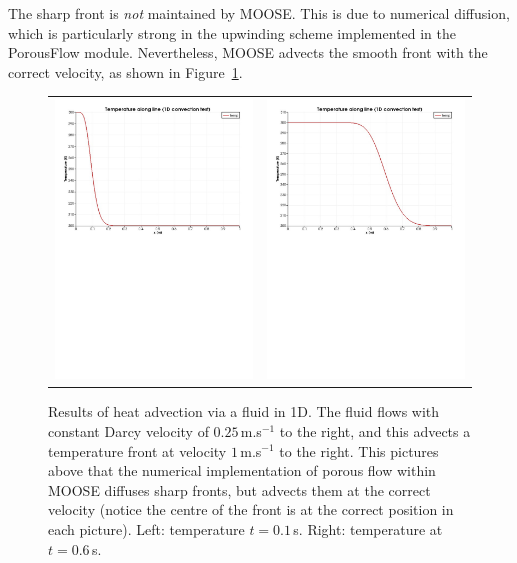 \documentclass[]{scrreprt}
\begin{document}
The sharp front is {\em not} maintained by
MOOSE.  This is due to numerical diffusion, which is particularly
strong in the upwinding scheme implemented in the PorousFlow module.
Nevertheless, MOOSE advects the smooth front with the correct
velocity, as shown in Figure~\ref{heat_advection_1d.fig}.

\begin{figure}[htb]
\begin{center}
\begin{tabular}{cc}
\includegraphics[width=7cm]{heat_advection_1d_0_1.pdf}  &
\includegraphics[width=7cm]{heat_advection_1d_0_6.pdf}
\end{tabular}
\caption{Results of heat advection via a fluid in 1D.  The fluid
  flows with constant Darcy velocity of $0.25$\,m.s$^{-1}$ to the
  right, and this advects a temperature front at velocity
  $1$\,m.s$^{-1}$ to the right.  This pictures above
  that the numerical implementation of porous flow within
  MOOSE diffuses sharp fronts, but advects them at the correct
  velocity (notice the centre of
  the front is at the correct position in each picture).  Left: temperature
  $t=0.1$\,s.  Right: temperature
  at $t=0.6$\,s.}
\label{heat_advection_1d.fig}
\end{center}
\end{figure}
\end{document}
